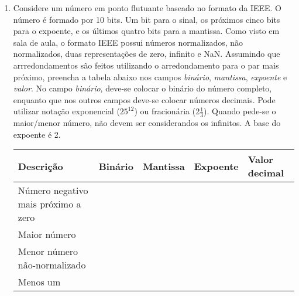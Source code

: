 \begin{enumerate}[resume]
    \item
    Considere um número em ponto flutuante baseado no formato da IEEE.
    O número é formado por 10 bits. 
    Um bit para o sinal, 
    os próximos cinco bits para o expoente,
    e os últimos quatro bits para a mantissa.
    Como visto em sala de aula, o formato IEEE possui números normalizados,
    não normalizados, duas representações de zero, infinito e NaN.
    Assumindo que arrredondamentos são feitos utilizando
    o arredondamento para o par mais próximo,
    preencha a tabela abaixo nos campos 
    \textit{binário}, \textit{mantissa}, \textit{expoente} e \textit{valor}.
    No campo \textit{binário}, deve-se colocar o binário do número completo,
    enquanto que nos outros campos deve-se colocar números decimais.
    Pode utilizar notação exponencial ($25^{12}$) ou fracionária (2$\frac{1}{3}$).
    Quando pede-se o maior/menor número, não devem ser considerandos os infinitos.
    A base do expoente é 2.

    \begin{table}[H]
        \begin{tabular}{|l|l|l|l|l|}
            \hline
            \textbf{Descrição}  & 
            \textbf{Binário}    & 
            \textbf{Mantissa}   &
            \textbf{Expoente}   &
            \textbf{Valor decimal} \\\hline
            Número negativo mais próximo a zero & & & & \\\hline
            Maior número & & & & \\\hline
            Menor número não-normalizado & & & & \\\hline
            Menos um & & & & \\
            \hline
        \end{tabular}
    \end{table}

\end{enumerate}
